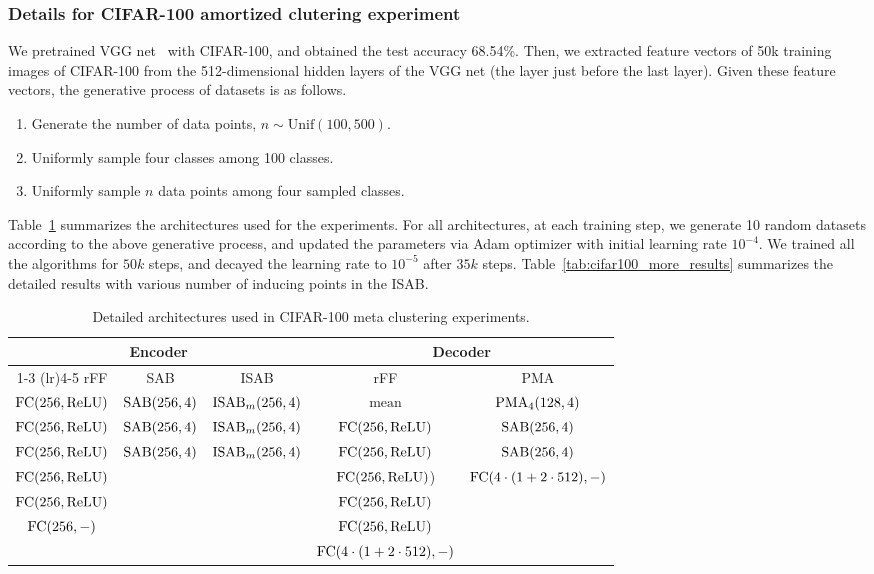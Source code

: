 \documentclass{article}
\begin{document}
\subsubsection{Details for CIFAR-100 amortized clutering experiment}
\label{subsec:cifar}
We pretrained VGG net~\citep{Simonyan2014} with CIFAR-100, and obtained the test accuracy 68.54\%. Then, we extracted feature vectors of 50k training images of CIFAR-100 from the 512-dimensional hidden layers of the VGG net (the layer just before the last layer). Given these feature vectors, the generative process of datasets is as follows.
\begin{enumerate}
\item Generate the number of data points, $n \sim \mathrm{Unif}(100, 500)$.
\item Uniformly sample four classes among 100 classes.
\item Uniformly sample $n$ data points among four sampled classes.
\end{enumerate}
Table~\ref{tab:cifar100_architecture} summarizes the architectures used for the experiments. For all architectures, at each training step, we generate 10 random datasets according to the above generative process, and updated the parameters via Adam optimizer with initial learning rate $10^{-4}$. We trained all the algorithms for $50k$ steps, and decayed the learning rate to $10^{-5}$ after $35k$ steps. Table~\ref{tab:cifar100_more_results} summarizes the detailed results with various number of inducing points in the ISAB.

\begin{table}
\small
\centering
\caption{Detailed architectures used in CIFAR-100 meta clustering experiments.}
\vspace{5pt}
\begin{tabular}{@{}ccccc@{}}\toprule
\multicolumn{3}{c}{Encoder} & \multicolumn{2}{c}{Decoder}\\
\cmidrule(lr){1-3} \cmidrule(lr){4-5}
rFF & SAB & ISAB & rFF & PMA \\
\midrule
$\mathrm{FC}(256,\mathrm{ReLU})$ & $\mathrm{SAB}(256, 4)$ & $\mathrm{ISAB}_m(256, 4)$ & $\mathrm{mean}$ & $\mathrm{PMA}_4(128,4)$\\
$\mathrm{FC}(256,\mathrm{ReLU})$ &  $\mathrm{SAB}(256, 4)$ & $\mathrm{ISAB}_m(256, 4)$ & $\mathrm{FC}(256,\mathrm{ReLU})$ & $\mathrm{SAB}(256, 4)$\\
$\mathrm{FC}(256,\mathrm{ReLU})$ &  $\mathrm{SAB}(256, 4)$ & $\mathrm{ISAB}_m(256, 4)$ & $\mathrm{FC}(256,\mathrm{ReLU})$ & $\mathrm{SAB}(256, 4)$ \\
$\mathrm{FC}(256,\mathrm{ReLU})$ & & & $\mathrm{FC}(256,\mathrm{ReLU})$) & $\mathrm{FC}(4\cdot(1+2\cdot 512),-)$ \\
$\mathrm{FC}(256,\mathrm{ReLU})$ & & &$\mathrm{FC}(256,\mathrm{ReLU})$ & \\
$\mathrm{FC}(256,-)$ & & & $\mathrm{FC}(256,\mathrm{ReLU})$ & \\
 & & & $\mathrm{FC}(4\cdot(1+2\cdot 512),-)$& \\
\bottomrule
\end{tabular}
\label{tab:cifar100_architecture}
\end{table}
\end{document}
